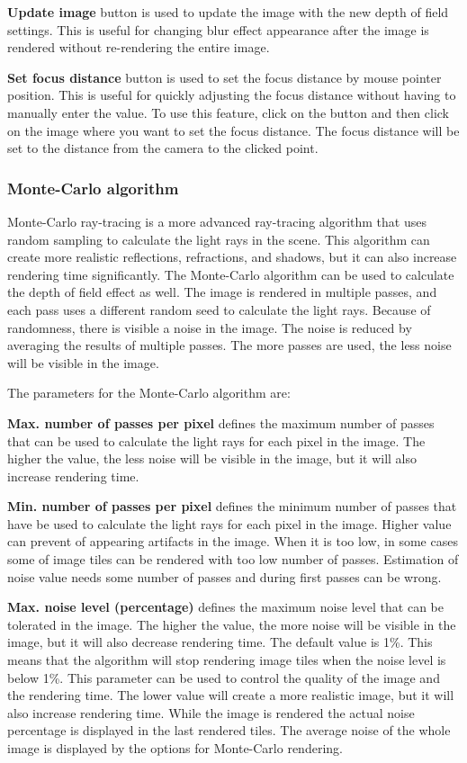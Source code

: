 \textbf{Update image} button is used to update the image with the new depth of field settings. This is useful for changing blur effect appearance after the image is rendered without re-rendering the entire image. 

\textbf{Set focus distance} button is used to set the focus distance by mouse pointer position. This is useful for quickly adjusting the focus distance without having to manually enter the value. To use this feature, click on the button and then click on the image where you want to set the focus distance. The focus distance will be set to the distance from the camera to the clicked point.

\subsubsection{Monte-Carlo algorithm}\label{effects-ray-tracing-monte-carlo}
Monte-Carlo ray-tracing is a more advanced ray-tracing algorithm that uses random sampling to calculate the light rays in the scene. This algorithm can create more realistic reflections, refractions, and shadows, but it can also increase rendering time significantly. The Monte-Carlo algorithm can be used to calculate the depth of field effect as well. The image is rendered in multiple passes, and each pass uses a different random seed to calculate the light rays. Because of randomness, there is visible a noise in the image. The noise is reduced by averaging the results of multiple passes. The more passes are used, the less noise will be visible in the image. 

The parameters for the Monte-Carlo algorithm are:

\textbf{Max. number of passes per pixel} defines the maximum number of passes that can be used to calculate the light rays for each pixel in the image. The higher the value, the less noise will be visible in the image, but it will also increase rendering time.

\textbf{Min. number of passes per pixel} defines the minimum number of passes that have be used to calculate the light rays for each pixel in the image. Higher value can prevent of appearing artifacts in the image. When it is too low, in some cases some of image tiles can be rendered with too low number of passes. Estimation of noise value needs some number of passes and during first passes can be wrong.

\textbf{Max. noise level (percentage)} defines the maximum noise level that can be tolerated in the image. The higher the value, the more noise will be visible in the image, but it will also decrease rendering time. The default value is 1\%. This means that the algorithm will stop rendering image tiles when the noise level is below 1\%. This parameter can be used to control the quality of the image and the rendering time. The lower value will create a more realistic image, but it will also increase rendering time.
While the image is rendered the actual noise percentage is displayed in the last rendered tiles. The average noise of the whole image is displayed by the options for Monte-Carlo rendering.

